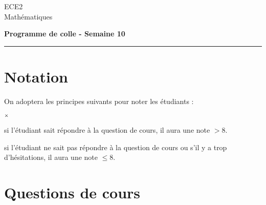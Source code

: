 \documentclass[11pt]{article}%
\begin{document}
\begin{flushleft}
ECE2 \\
Mathématiques
\end{flushleft}


\vspace{0.1cm}

\begin{center}
\textbf{\Large{Programme de colle - Semaine 10}}
\end{center}

\hrule

\vspace*{0,2cm}

\section*{Notation}

\noindent
On adoptera les principes suivants pour noter les étudiants :
\begin{noliste}{$\scriptstyle \times$}
\item si l'étudiant sait répondre à la question de cours, il 
aura une note $>8$.
\item si l'étudiant ne sait pas répondre à la question de 
cours ou s'il y a trop d'hésitations, il aura une note $\leq 8$.
\end{noliste}

\section*{Questions de cours}
\end{document}
